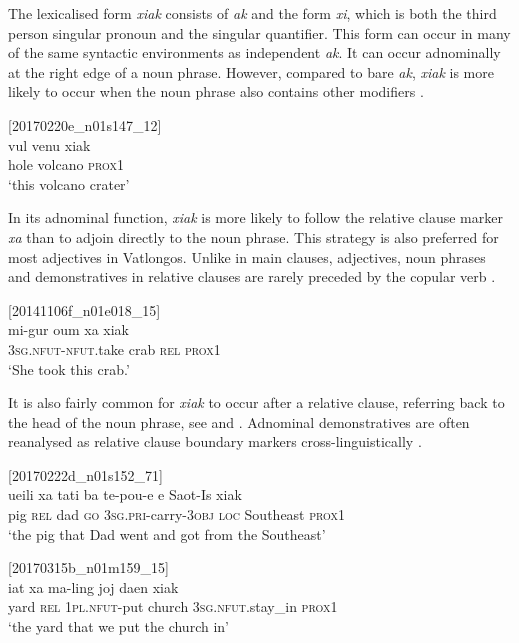 \documentclass[output=paper,colorlinks,citecolor=brown]{langscibook}
\begin{document}
The lexicalised form \textit{xiak} consists of \textit{ak} and the form \textit{xi}, which is both the third person singular pronoun and the singular quantifier. This form can occur in many of the same syntactic environments as independent \textit{ak}. It can occur adnominally at the right edge of a noun phrase. However, compared to bare \textit{ak}, \textit{xiak} is more likely to occur when the noun phrase also contains other modifiers .

\ea
{\label{ex:ridge:17}[20170220e\_n01s147\_12]}\\
\gll vul  venu    xiak\\
     hole  volcano  \textsc{prox1}\\
\glt ‘this volcano crater’
\z

In its adnominal function, \textit{xiak} is more likely to follow the relative clause marker \textit{xa} than to adjoin directly to the noun phrase. This strategy is also preferred for most adjectives in Vatlongos. Unlike in main clauses, adjectives, noun phrases and demonstratives in relative clauses are rarely preceded by the copular verb .

\ea
{\label{ex:ridge:18}[20141106f\_n01e018\_15]}\\
\gll mi-gur      oum  xa  xiak\\
     \textsc{3sg.nfut-nfut.}take  crab  \textsc{rel}  \textsc{prox1}\\
\glt ‘She took this crab.’
\z

It is also fairly common for \textit{xiak} to occur after a relative clause, referring back to the head of the noun phrase, see  and . Adnominal demonstratives are often reanalysed as relative clause boundary markers cross-linguistically \citep[132-135]{Diessel1999Book}.

\ea
{\label{ex:ridge:19}[20170222d\_n01s152\_71]}\\
\gll ueili  {\ob}xa  tati  ba  te-pou-e    e  Saot-Is{\cb}   xiak\\
     pig   {\db}\textsc{rel}  dad   \textsc{go}  \textsc{3sg.pri}{}-carry-\textsc{3obj} \textsc{loc}  Southeast  \textsc{prox1}\\
\glt ‘the pig that Dad went and got from the Southeast’
\z

\ea
{\label{ex:ridge:20}[20170315b\_n01m159\_15]}\\
\gll iat  {\ob}xa  ma-ling    joj      daen{\cb}      xiak\\
     yard   {\db}\textsc{rel}   \textsc{1pl.nfut}{}-put   church \textsc{3sg.nfut}.stay\_in  \textsc{prox1}\\
\glt ‘the yard that we put the church in’
\z
\end{document}

